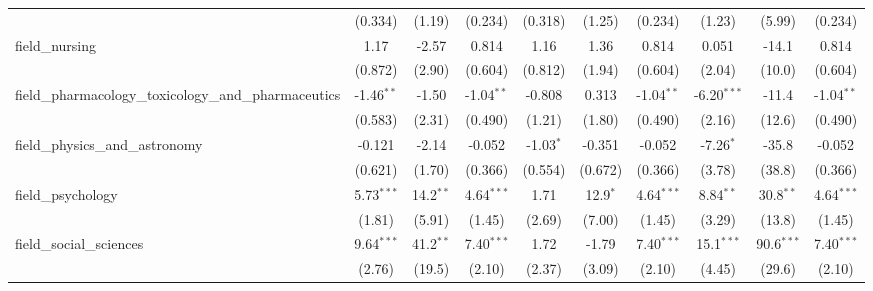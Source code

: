 \begin{tabular}{lccccccccc}
                                                               & (0.334)        & (1.19)        & (0.234)        & (0.318)        & (1.25)       & (0.234)        & (1.23)         & (5.99)        & (0.234)\\   
   field\_nursing                                              & 1.17           & -2.57         & 0.814          & 1.16           & 1.36         & 0.814          & 0.051          & -14.1         & 0.814\\   
                                                               & (0.872)        & (2.90)        & (0.604)        & (0.812)        & (1.94)       & (0.604)        & (2.04)         & (10.0)        & (0.604)\\   
   field\_pharmacology\_toxicology\_and\_pharmaceutics         & -1.46$^{**}$   & -1.50         & -1.04$^{**}$   & -0.808         & 0.313        & -1.04$^{**}$   & -6.20$^{***}$  & -11.4         & -1.04$^{**}$\\   
                                                               & (0.583)        & (2.31)        & (0.490)        & (1.21)         & (1.80)       & (0.490)        & (2.16)         & (12.6)        & (0.490)\\   
   field\_physics\_and\_astronomy                              & -0.121         & -2.14         & -0.052         & -1.03$^{*}$    & -0.351       & -0.052         & -7.26$^{*}$    & -35.8         & -0.052\\   
                                                               & (0.621)        & (1.70)        & (0.366)        & (0.554)        & (0.672)      & (0.366)        & (3.78)         & (38.8)        & (0.366)\\   
   field\_psychology                                           & 5.73$^{***}$   & 14.2$^{**}$   & 4.64$^{***}$   & 1.71           & 12.9$^{*}$   & 4.64$^{***}$   & 8.84$^{**}$    & 30.8$^{**}$   & 4.64$^{***}$\\   
                                                               & (1.81)         & (5.91)        & (1.45)         & (2.69)         & (7.00)       & (1.45)         & (3.29)         & (13.8)        & (1.45)\\   
   field\_social\_sciences                                     & 9.64$^{***}$   & 41.2$^{**}$   & 7.40$^{***}$   & 1.72           & -1.79        & 7.40$^{***}$   & 15.1$^{***}$   & 90.6$^{***}$  & 7.40$^{***}$\\   
                                                               & (2.76)         & (19.5)        & (2.10)         & (2.37)         & (3.09)       & (2.10)         & (4.45)         & (29.6)        & (2.10)\\   

\end{tabular}
